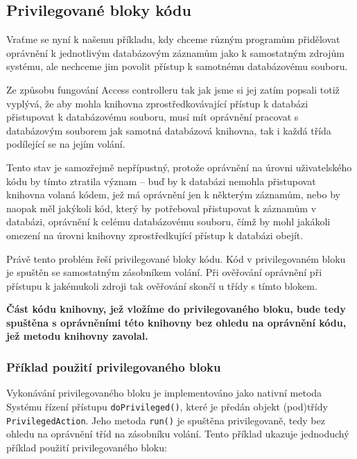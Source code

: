 \subsection{Privilegované bloky kódu}\label{privilegovaneBloky}

Vraťme se nyní k našemu příkladu, kdy chceme různým programům přidělovat oprávnění k jednotlivým databázovým záznamům jako k samostatným zdrojům systému, ale nechceme jim povolit přístup k samotnému databázovému souboru.

Ze způsobu fungování Access controlleru tak jak jsme si jej zatím popsali totiž vyplývá, že aby mohla knihovna zprostředkovávající přístup k databázi přistupovat k databázovému souboru, musí mít oprávnění pracovat s databázovým souborem jak samotná databázová knihovna, tak i každá třída podílející se na jejím volání.

Tento stav je samozřejmě nepřípustný, protože oprávnění na úrovni uživatelského kódu by tímto ztratila význam -- buď by k databázi nemohla přistupovat knihovna volaná kódem, jež má oprávnění jen k některým záznamům, nebo by naopak měl jakýkoli kód, který by potřeboval přistupovat k záznamům v databázi, oprávnění k celému databázovému souboru, čímž by mohl jakákoli omezení na úrovni knihovny zprostředkující přístup k databázi obejít.

Právě tento problém řeší privilegované bloky kódu. Kód v privilegovaném bloku je spuštěn se samostatným zásobníkem volání. Při ověřování oprávnění při přístupu k jakémukoli zdroji tak ověřování skončí u třídy s tímto blokem.

{\bf Část kódu knihovny, jež vložíme do privilegovaného bloku, bude tedy spuštěna s oprávněními této knihovny bez ohledu na oprávnění kódu, jež metodu knihovny zavolal.}

\subsubsection{Příklad použití privilegovaného bloku}

Vykonávání privilegovaného bloku je implementováno jako nativní metoda Systému řízení přístupu {\tt doPrivileged()}, které je předán objekt (pod)třídy {\tt PrivilegedAction}. Jeho metoda {\tt run()} je spuštěna privilegovaně, tedy bez ohledu na oprávnění tříd na zásobníku volání.
Tento příklad ukazuje jednoduchý příklad použití privilegovaného bloku: \cite{refAccessController}

